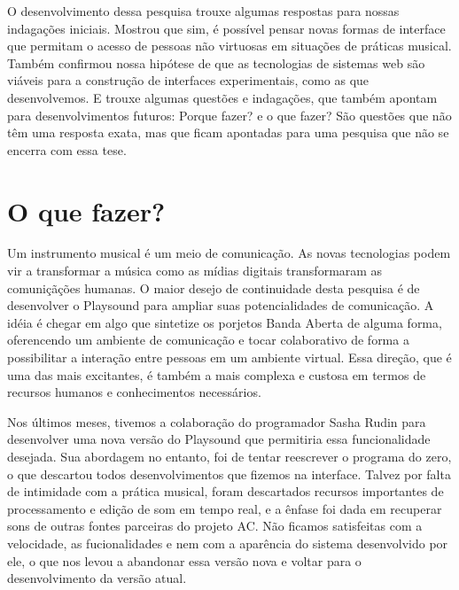 O desenvolvimento dessa pesquisa trouxe algumas respostas para nossas indagações iniciais. Mostrou que sim, é possível pensar novas formas de interface que permitam o acesso de pessoas não virtuosas em situações de práticas musical. Também confirmou nossa hipótese de que as tecnologias de sistemas web são viáveis para a construção de interfaces experimentais, como as que desenvolvemos. E trouxe algumas questões e indagações, que também apontam para desenvolvimentos futuros: Porque fazer? e o que fazer? São questões que não têm uma resposta exata, mas que ficam apontadas para uma pesquisa que não se encerra com essa tese.


\section{O que fazer?}

Um instrumento musical é um meio de comunicação. As novas tecnologias podem vir a transformar a música como as mídias digitais transformaram as comuniçãções humanas. O maior desejo de continuidade desta pesquisa é de desenvolver o Playsound para ampliar suas potencialidades de comunicação. A idéia é chegar em algo que sintetize os porjetos Banda Aberta de alguma forma, oferencendo um ambiente de comunicação e tocar colaborativo de forma a possibilitar a interação entre pessoas em um ambiente virtual. Essa direção, que é uma das mais excitantes, é também a mais complexa e custosa em termos de recursos humanos e conhecimentos necessários.

Nos últimos meses, tivemos a colaboração do programador Sasha Rudin para desenvolver uma nova versão do Playsound que permitiria essa funcionalidade desejada. Sua abordagem no entanto, foi de tentar reescrever o programa do zero, o que descartou todos desenvolvimentos que fizemos na interface. Talvez por falta de intimidade com a prática musical, foram descartados recursos importantes de processamento e edição de som em tempo real, e a ênfase foi dada em recuperar sons de outras fontes parceiras do projeto AC. Não ficamos satisfeitas com a velocidade, as fucionalidades e nem com a aparência do sistema desenvolvido por ele, o que nos levou a abandonar essa versão nova e voltar para o desenvolvimento da versão atual. 


